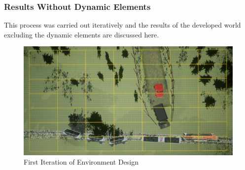 \subsubsection{Results Without Dynamic Elements}
This process was carried out iteratively and the results of the developed world excluding the dynamic elements are discussed here. 
\begin{figure}
    \centering
    \includegraphics{Chapters/SimulationEnv/Figs/RailScenarioFirstIteration.png}
    \caption{First Iteration of Environment Design}
    \label{fig:firstIterationVEnv}
\end{figure}

